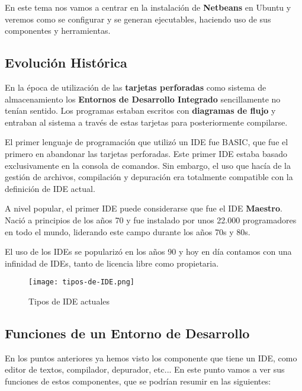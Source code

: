 En este tema nos vamos a centrar en la instalación de \textbf{Netbeans} en Ubuntu y veremos como se configurar y se generan ejecutables, haciendo uso de sus componentes y herramientas.

\subsection{Evolución Histórica}
En la época de utilización de las \textbf{\gls{tarjetas perforadas}} como sistema de almacenamiento los \textbf{Entornos de Desarrollo Integrado} sencillamente no tenían sentido. Los programas estaban escritos con \textbf{diagramas de flujo} y entraban al sistema a través de estas tarjetas para posteriormente compilarse.

El primer lenguaje de programación que utilizó un IDE fue BASIC, que fue el primero en abandonar las tarjetas perforadas. Este primer IDE estaba basado exclusivamente en la consola de comandos. Sin embargo, el uso que hacía de la gestión de archivos, compilación y depuración era totalmente compatible con la definición de IDE actual.

A nivel popular, el primer IDE puede considerarse que fue el IDE \textbf{Maestro}. Nació a principios de los años 70 y fue instalado por unos 22.000 programadores en todo el mundo, liderando este campo durante los años 70s y 80s.

El uso de los IDEs se popularizó en los años 90 y hoy en día contamos con una infinidad de IDEs, tanto de licencia libre como propietaria.

\begin{figure}[ht]
    \centering
    \texttt{[image: tipos-de-IDE.png]}
    \caption{Tipos de IDE actuales}
\end{figure}

\subsection{Funciones de un Entorno de Desarrollo}
En los puntos anteriores ya hemos visto los componente que tiene un IDE, como editor de textos, compilador, depurador, etc... En este punto vamos a ver sus funciones de estos componentes, que se podrían resumir en las siguientes:


